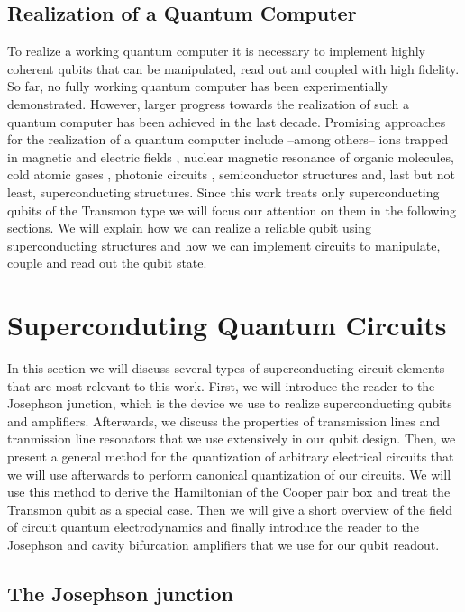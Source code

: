 \subsection{Realization of a Quantum Computer}

To realize a working quantum computer it is necessary to implement highly coherent qubits that can be manipulated, read out and coupled with high fidelity. So far, no fully working quantum computer has been experimentially demonstrated. However, larger progress towards the realization of such a quantum computer has been achieved in the last decade. Promising approaches for the realization of a quantum computer include --among others-- ions trapped in magnetic and electric fields \citep{}, nuclear magnetic resonance of organic molecules, cold atomic gases \citep{}, photonic circuits \citep{}, semiconductor structures \citep{} and, last but not least, superconducting structures. Since this work treats only superconducting qubits of the Transmon type we will focus our attention on them in the following sections. We will explain how we can realize a reliable qubit using superconducting structures and how we can implement circuits to manipulate, couple and read out the qubit state.

\section{Superconduting Quantum Circuits}

In this section we will discuss several types of superconducting circuit elements that are most relevant to this work. First, we will introduce the reader to the Josephson junction, which is the device we use to realize superconducting qubits and amplifiers. Afterwards, we discuss the properties of transmission lines and tranmission line resonators that we use extensively in our qubit design. Then, we present a general method for the quantization of arbitrary electrical circuits that we will use afterwards to perform canonical quantization of our circuits. We will use this method to derive the Hamiltonian of the Cooper pair box and treat the Transmon qubit as a special case. Then we will give a short overview of the field of circuit quantum electrodynamics and finally introduce the reader to the Josephson and cavity bifurcation amplifiers that we use for our qubit readout.

\subsection{The Josephson junction}

